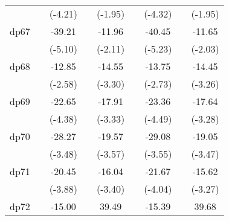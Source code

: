 {\begin{tabular}{l*{8}{c}}
            &                     &     (-4.21)         &                     &     (-1.95)         &                     &     (-4.32)         &                     &     (-1.95)         \\
[1em]
dp67        &                     &      -39.21\sym{***}&                     &      -11.96\sym{*}  &                     &      -40.45\sym{***}&                     &      -11.65\sym{*}  \\
            &                     &     (-5.10)         &                     &     (-2.11)         &                     &     (-5.23)         &                     &     (-2.03)         \\
[1em]
dp68        &                     &      -12.85\sym{**} &                     &      -14.55\sym{***}&                     &      -13.75\sym{**} &                     &      -14.45\sym{**} \\
            &                     &     (-2.58)         &                     &     (-3.30)         &                     &     (-2.73)         &                     &     (-3.26)         \\
[1em]
dp69        &                     &      -22.65\sym{***}&                     &      -17.91\sym{***}&                     &      -23.36\sym{***}&                     &      -17.64\sym{**} \\
            &                     &     (-4.38)         &                     &     (-3.33)         &                     &     (-4.49)         &                     &     (-3.28)         \\
[1em]
dp70        &                     &      -28.27\sym{***}&                     &      -19.57\sym{***}&                     &      -29.08\sym{***}&                     &      -19.05\sym{***}\\
            &                     &     (-3.48)         &                     &     (-3.57)         &                     &     (-3.55)         &                     &     (-3.47)         \\
[1em]
dp71        &                     &      -20.45\sym{***}&                     &      -16.04\sym{***}&                     &      -21.67\sym{***}&                     &      -15.62\sym{**} \\
            &                     &     (-3.88)         &                     &     (-3.40)         &                     &     (-4.04)         &                     &     (-3.27)         \\
[1em]
dp72        &                     &      -15.00\sym{*}  &                     &       39.49\sym{**} &                     &      -15.39\sym{*}  &                     &       39.68\sym{**} \\

\end{tabular}}
